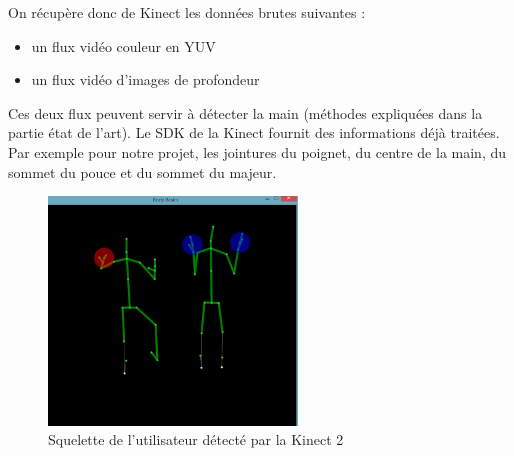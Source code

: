 On récupère donc de Kinect les données brutes suivantes : 
\begin{itemize}
 \item un flux vidéo couleur en YUV
 \item un flux vidéo d'images de profondeur
\end{itemize}

Ces deux flux peuvent servir à détecter la main (méthodes expliquées dans la partie état de l'art).
Le SDK de la Kinect fournit des informations déjà traitées. 
Par exemple pour notre projet, les jointures du poignet, du centre de la main, du sommet du pouce et du sommet du majeur.

\begin{figure}[H]
\center
\includegraphics[width=250px]{images/kinec2_skel.png}
\caption{Squelette de l'utilisateur détecté par la Kinect 2}
\label{fig:skeleton_kinect2}
\end{figure}

